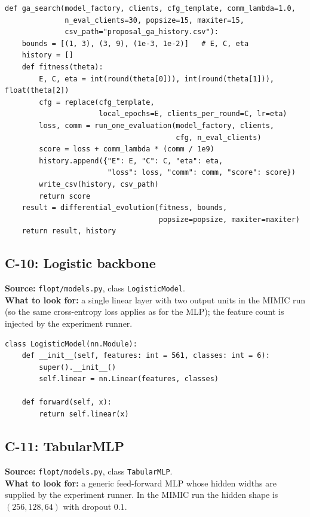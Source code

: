 \begin{lstlisting}
def ga_search(model_factory, clients, cfg_template, comm_lambda=1.0,
              n_eval_clients=30, popsize=15, maxiter=15,
              csv_path="proposal_ga_history.csv"):
    bounds = [(1, 3), (3, 9), (1e-3, 1e-2)]   # E, C, eta
    history = []
    def fitness(theta):
        E, C, eta = int(round(theta[0])), int(round(theta[1])), float(theta[2])
        cfg = replace(cfg_template,
                      local_epochs=E, clients_per_round=C, lr=eta)
        loss, comm = run_one_evaluation(model_factory, clients,
                                        cfg, n_eval_clients)
        score = loss + comm_lambda * (comm / 1e9)
        history.append({"E": E, "C": C, "eta": eta,
                        "loss": loss, "comm": comm, "score": score})
        write_csv(history, csv_path)
        return score
    result = differential_evolution(fitness, bounds,
                                    popsize=popsize, maxiter=maxiter)
    return result, history
\end{lstlisting}

\subsection{C-10: Logistic backbone}
\textbf{Source:} \texttt{flopt/models.py}, class
\texttt{LogisticModel}.\\
\textbf{What to look for:} a single linear layer with two
output units in the MIMIC run (so the same cross-entropy loss applies
as for the MLP); the feature count is injected by the experiment runner.

\begin{lstlisting}
class LogisticModel(nn.Module):
    def __init__(self, features: int = 561, classes: int = 6):
        super().__init__()
        self.linear = nn.Linear(features, classes)

    def forward(self, x):
        return self.linear(x)
\end{lstlisting}

\subsection{C-11: TabularMLP}
\textbf{Source:} \texttt{flopt/models.py}, class \texttt{TabularMLP}.\\
\textbf{What to look for:} a generic feed-forward MLP whose hidden
widths are supplied by the experiment runner. In the MIMIC run the
hidden shape is $(256, 128, 64)$ with dropout $0.1$.

